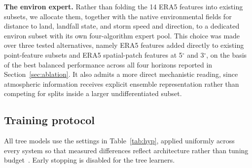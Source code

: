 \documentclass{ametsocv6.1}
\newcommand{\era}{ERA5}
\begin{document}
\textbf{The environ expert.} Rather than folding the 14 \era{} features into
existing subsets, we allocate them, together with the native environmental fields
for distance to land, landfall state, and storm speed and direction, to a
dedicated environ subset with its own four-algorithm expert pool. This choice was
made over three tested alternatives, namely \era{} features added directly to
existing point-feature subsets and \era{} spatial-patch features at 5$^\circ$ and
3$^\circ$, on the basis of the best balanced performance across all four horizons
reported in Section~\ref{sec:ablation}. It also admits a more direct mechanistic
reading, since atmospheric information receives explicit ensemble representation
rather than competing for splits inside a larger undifferentiated subset.

\subsection{Training protocol}
All tree models use the settings in Table~\ref{tab:hyp}, applied uniformly across
every system so that measured differences reflect architecture rather than
tuning budget~\citep{grinsztajn2022tree}. Early stopping is disabled for the tree
learners.
\end{document}
